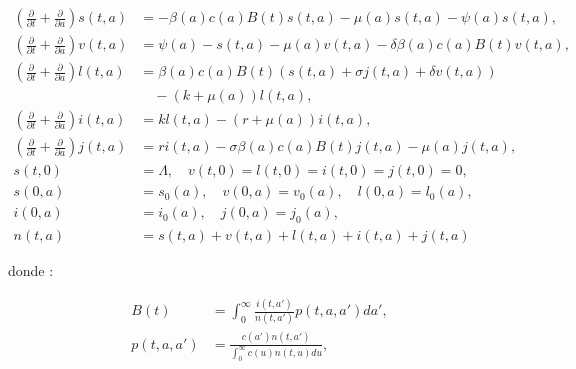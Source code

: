 \documentclass[
]{book}
\begin{document}
\begin{equation}
\begin{split}
\left(\frac{\partial}{\partial t}+\frac{\partial}{\partial a} \right) s(t,a) &= -\beta(a)c(a)B(t)s(t,a)-\mu(a)s(t,a)-\psi(a)s(t,a),                                   \\
\left(\frac{\partial}{\partial t}+\frac{\partial}{\partial a} \right) v(t,a) &= \psi(a)-s(t,a)-\mu(a)v(t,a)-\delta\beta(a)c(a)B(t)v(t,a) ,                            \\
\left(\frac{\partial}{\partial t}+\frac{\partial}{\partial a} \right) l(t,a) &= \beta(a)c(a)B(t)(s(t,a)+\sigma j(t,a)+\delta v(t,a)) \\
& \quad-(k+\mu(a))l(t,a),                \\
\left(\frac{\partial}{\partial t}+\frac{\partial}{\partial a} \right) i(t,a) &= kl(t,a)-(r+\mu(a))i(t,a),                                                                                       \\
\left(\frac{\partial}{\partial t}+\frac{\partial}{\partial a} \right)j(t,a) &= ri(t,a)-\sigma\beta(a)c(a)B(t)j(t,a)-\mu(a)j(t,a),                                    \\
s(t,0) &= \Lambda,\quad v(t,0)=l(t,0)=i(t,0)=j(t,0)=0,                                \\
s(0,a) &= s_0(a),\quad v(0,a) = v_0(a),\quad l(0,a) = l_0(a),                         \\
i(0,a) &= i_0(a),\quad j(0,a)=j_0(a),                                                 \\
n(t,a) &= s(t,a)+v(t,a)+l(t,a)+i(t,a)+j(t,a)
\end{split}
\label{eq:modelo}
\end{equation}

donde :

\begin{align*}
B(t) &= \int_0^\infty \frac{i(t,a')}{n(t,a')}p(t,a,a')da',                            \\
p(t,a,a') &= \frac{c(a')n(t,a')}{\int_0^\infty c(u)n(t,u)du},
\end{align*}
\end{document}
